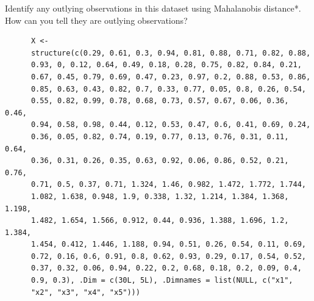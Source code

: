 \documentclass[12pt]{article}
\makeatletter
\theoremstyle{homework}
\newenvironment{exercise}[1]
{\def\@currentlabel{#1}\exercisecore}
{\endexercisecore}
\makeatother
\begin{document}
\begin{exercise}{1}Identify any outlying observations in this dataset using
  Mahalanobis distance*.  How can you tell they are outlying
  observations?\\

  \begin{footnotesize}
    \begin{verbatim}
      X <-
      structure(c(0.29, 0.61, 0.3, 0.94, 0.81, 0.88, 0.71, 0.82, 0.88, 
      0.93, 0, 0.12, 0.64, 0.49, 0.18, 0.28, 0.75, 0.82, 0.84, 0.21, 
      0.67, 0.45, 0.79, 0.69, 0.47, 0.23, 0.97, 0.2, 0.88, 0.53, 0.86, 
      0.85, 0.63, 0.43, 0.82, 0.7, 0.33, 0.77, 0.05, 0.8, 0.26, 0.54, 
      0.55, 0.82, 0.99, 0.78, 0.68, 0.73, 0.57, 0.67, 0.06, 0.36, 0.46, 
      0.94, 0.58, 0.98, 0.44, 0.12, 0.53, 0.47, 0.6, 0.41, 0.69, 0.24, 
      0.36, 0.05, 0.82, 0.74, 0.19, 0.77, 0.13, 0.76, 0.31, 0.11, 0.64, 
      0.36, 0.31, 0.26, 0.35, 0.63, 0.92, 0.06, 0.86, 0.52, 0.21, 0.76, 
      0.71, 0.5, 0.37, 0.71, 1.324, 1.46, 0.982, 1.472, 1.772, 1.744, 
      1.082, 1.638, 0.948, 1.9, 0.338, 1.32, 1.214, 1.384, 1.368, 1.198, 
      1.482, 1.654, 1.566, 0.912, 0.44, 0.936, 1.388, 1.696, 1.2, 1.384, 
      1.454, 0.412, 1.446, 1.188, 0.94, 0.51, 0.26, 0.54, 0.11, 0.69, 
      0.72, 0.16, 0.6, 0.91, 0.8, 0.62, 0.93, 0.29, 0.17, 0.54, 0.52, 
      0.37, 0.32, 0.06, 0.94, 0.22, 0.2, 0.68, 0.18, 0.2, 0.09, 0.4, 
      0.9, 0.3), .Dim = c(30L, 5L), .Dimnames = list(NULL, c("x1", 
      "x2", "x3", "x4", "x5")))
    \end{verbatim}
    \end{footnotesize}


\end{exercise}
\end{document}
